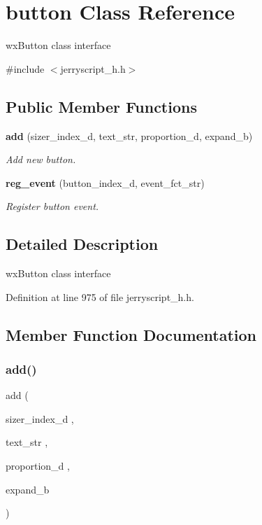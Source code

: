 \section{button Class Reference}
\label{classbutton}


wx\+Button class interface  




{\ttfamily \#include $<$jerryscript\+\_\+h.\+h$>$}

\subsection*{Public Member Functions}
\begin{DoxyCompactItemize}
\item 
\textbf{ add} (sizer\+\_\+index\+\_\+d, text\+\_\+str, proportion\+\_\+d, expand\+\_\+b)
\begin{DoxyCompactList}\small\item\em Add new button. \end{DoxyCompactList}\item 
\textbf{ reg\+\_\+event} (button\+\_\+index\+\_\+d, event\+\_\+fct\+\_\+str)
\begin{DoxyCompactList}\small\item\em Register button event. \end{DoxyCompactList}\end{DoxyCompactItemize}


\subsection{Detailed Description}
wx\+Button class interface 

Definition at line 975 of file jerryscript\+\_\+h.\+h.



\subsection{Member Function Documentation}
\mbox{\label{classbutton_ab82d2b4bd8074db58ceb9165b163cb9c}} 
\subsubsection{add()}
{\footnotesize\ttfamily add (\begin{DoxyParamCaption}\item[{sizer\+\_\+index\+\_\+d}]{,  }\item[{text\+\_\+str}]{,  }\item[{proportion\+\_\+d}]{,  }\item[{expand\+\_\+b}]{ }\end{DoxyParamCaption})}



